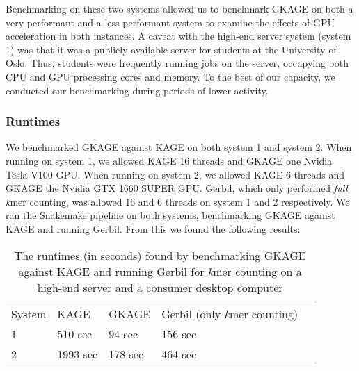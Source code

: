 Benchmarking on these two systems allowed us to benchmark GKAGE on both a very performant and a less performant system to examine the effects of GPU acceleration in both instances.
A caveat with the high-end server system (system 1) was that it was a publicly available server for students at the University of Oslo.
Thus, students were frequently running jobs on the server, occupying both CPU and GPU processing cores and memory.
To the best of our capacity, we conducted our benchmarking during periods of lower activity.

\subsubsection{Runtimes} \label{results:benchmarking:runtimes}
We benchmarked GKAGE against KAGE on both system 1 and system 2.
When running on system 1, we allowed KAGE 16 threads and GKAGE one Nvidia Tesla V100 GPU.
When running on system 2, we allowed KAGE 6 threads and GKAGE the Nvidia GTX 1660 SUPER GPU.
Gerbil, which only performed \textit{full} \textit{k}mer counting, was allowed 16 and 6 threads on system 1 and 2 respectively.
We ran the Snakemake pipeline on both systems, benchmarking GKAGE against KAGE and running Gerbil.
From this we found the following results:

\begin{table}[H]
\begin{center}
\begin{tabular}{lllll}
  \multicolumn{1}{l|}{System} & \multicolumn{1}{l}{KAGE}     & \multicolumn{1}{l}{GKAGE} & \multicolumn{1}{l}{Gerbil (only \textit{k}mer counting)} & \\ \cline{1-4}
\multicolumn{1}{l|}{1}      & \multicolumn{1}{l}{510 sec}  & \multicolumn{1}{l}{94 sec} & \multicolumn{1}{l}{156 sec} & \\
\multicolumn{1}{l|}{2}      & \multicolumn{1}{l}{1993 sec} & \multicolumn{1}{l}{178 sec} & \multicolumn{1}{l}{464 sec} & \\
\end{tabular}
\end{center}
\caption{
  The runtimes (in seconds) found by benchmarking GKAGE against KAGE and running Gerbil for \textit{k}mer counting on a high-end server and a consumer desktop computer
}
\label{results:benchmarking:tables:runtimes}
\end{table}

 
